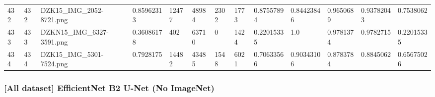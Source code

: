 \documentclass[11pt, a4paper, twoside]{report}
\begin{document}
\begin{longtable}[c]{@{}lllllllllllll@{}}
432 & 432 & DZK15\_IMG\_2052-8721.png & 0.85962313 & 12477 & 48984 & 2302 & 1773 & 0.87557894 & 0.84423846 & 0.9650689 & 0.93782043 & 0.7538062 \\
433 & 433 & DZKN15\_IMG\_6327-3591.png & 0.36086178 & 402 & 63710 & 0 & 1424 & 0.22015335 & 1.0 & 0.9781374 & 0.9782715 & 0.22015335 \\
434 & 434 & DZK15\_IMG\_5301-7524.png & 0.7928175 & 14482 & 43485 & 1548 & 6021 & 0.70633566 & 0.90343106 & 0.8783784 & 0.8845062 & 0.65675026 \\* \bottomrule
\end{longtable}

\newpage

\subsubsection{[All dataset] EfficientNet B2 U-Net (No ImageNet)}
\end{document}
